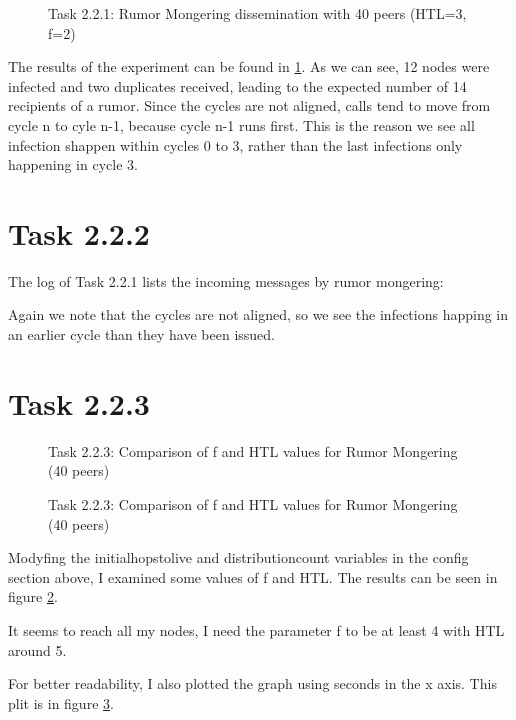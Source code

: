\documentclass[a4paper]{article}
\begin{document}
\begin{figure}
    
    \caption{Task 2.2.1: Rumor Mongering dissemination with 40 peers (HTL=3, f=2)}
    \label{fig:2-2-1}
\end{figure}

The results of the experiment can be found in \ref{fig:2-2-1}. As we can see, 12 nodes were infected and two duplicates received, leading to the expected number of 14 recipients of a rumor. Since the cycles are not aligned, calls tend to move from cycle n to cyle n-1, because cycle n-1 runs first. This is the reason we see all infection shappen within cycles 0 to 3, rather than the last infections only happening in cycle 3.


\section{Task 2.2.2}

The log of Task 2.2.1 lists the incoming messages by rumor mongering:



Again we note that the cycles are not aligned, so we see the infections happing in an earlier cycle than they have been issued.

\section{Task 2.2.3}

\begin{figure}
    
    \caption{Task 2.2.3: Comparison of f and HTL values for Rumor Mongering (40 peers)}
    \label{fig:2-2-3}
\end{figure}

\begin{figure}
    
    \caption{Task 2.2.3: Comparison of f and HTL values for Rumor Mongering (40 peers)}
    \label{fig:2-2-3_seconds}
\end{figure}

Modyfing the initial\textunderscore hops\textunderscore to\textunderscore live and distribution\textunderscore count variables in the config section above, I examined some values of f and HTL. The results can be seen in figure \ref{fig:2-2-3}.

It seems to reach all my nodes, I need the parameter f to be at least 4 with HTL around 5.

For better readability, I also plotted the graph using seconds in the x axis. This plit is in figure \ref{fig:2-2-3_seconds}.
\end{document}
